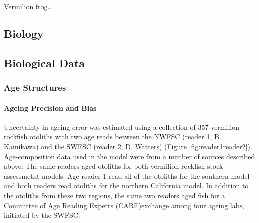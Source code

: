 \documentclass[11pt,
  english,
  a4paper,
]{article}
\begin{document}
Vermilion frog..


\hypertarget{biology}{%
\subsection{Biology}\label{biology}}

\leavevmode\tagmcend\tagstructend


\hypertarget{biological-data}{%
\subsection{Biological Data}\label{biological-data}}

\leavevmode\tagmcend\tagstructend


\hypertarget{age-structures}{%
\subsubsection{Age Structures}\label{age-structures}}

\leavevmode\tagmcend\tagstructend


\hypertarget{ageing-precision-and-bias}{%
\paragraph{Ageing Precision and Bias}\label{ageing-precision-and-bias}}

\leavevmode\tagmcend\tagstructend

Uncertainty in ageing error was estimated using a collection of 357 vermilion rockfish otoliths with two age reads between the NWFSC (reader 1, B. Kamikawa) and the SWFSC (reader 2, D. Watters) (Figure \ref{fig:reader1reader2}). Age-composition data used in the model were from a number of sources described above. The same readers aged otoliths for both vermilion rockfish stock assessmetnt models. Age reader 1 read all of the otoliths for the southern model and both readers read otoliths for the northern California model. In addition to the otoliths from these two regions, the same two readers aged fish for a Committee of Age Reading Experts (CARE)exchange among four ageing labs, initiated by the SWFSC.
\end{document}
